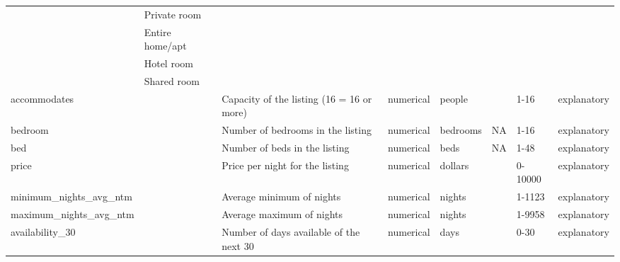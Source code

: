 \begin{center}
\begin{xltabular}{\textwidth}{llXlllll}
                            & Private room                &                                   &             &                &                             &                     &  \\
                            & Entire home/apt  &                                   &             &                &                             &                     &  \\
                                                        & Hotel room  &                                   &             &                &                             &                     &  \\

                            & Shared room                 &                                   &             &                &                             &                     &  \\
accommodates                 &                             & Capacity of the listing (16 = 16 or more) & numerical   & people         &                             &                     1-16    & explanatory \\
bedroom                     &                             & Number of bedrooms in the listing                           & numerical   & bedrooms       & NA                          &                     1-16    & explanatory \\
bed                         &                             & Number of beds in the listing                           & numerical   & beds           & NA                          &                     1-48    & explanatory \\
price                       &                             & Price per night for the listing                           & numerical   & dollars        &                             &                     0-10000 & explanatory \\
minimum\_nights\_avg\_ntm &                             & Average minimum of nights & numerical   & nights         &                             &                     1-1123  & explanatory \\
maximum\_nights\_avg\_ntm &                             & Average maximum of nights & numerical   & nights         &                             &                     1-9958  & explanatory \\
availability\_30            &                             & Number of days available of the next 30 & numerical   & days           &                             &                     0-30    & explanatory \\

\end{xltabular}
\end{center}
